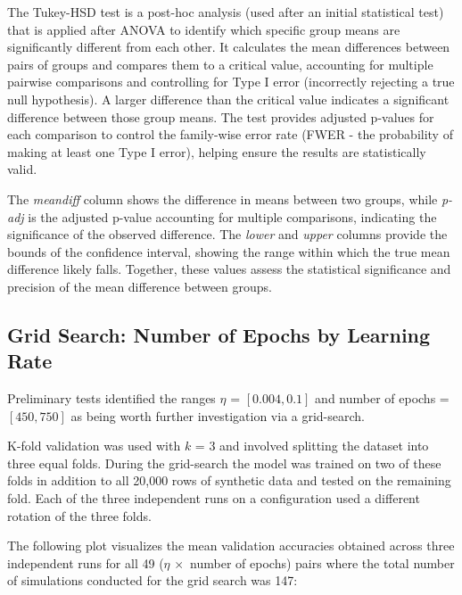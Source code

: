 The Tukey-HSD test is a post-hoc analysis (used after an initial statistical test) that is applied after ANOVA to 
identify which specific group means are significantly different from each other. It calculates the mean differences 
between pairs of groups and compares them to a critical value, accounting for multiple pairwise comparisons and 
controlling for Type I error (incorrectly rejecting a true null hypothesis). A larger difference than the critical 
value indicates a significant difference between those group means. The test provides adjusted p-values for each 
comparison to control the family-wise error rate (FWER - the probability of making at least one Type I error), 
helping ensure the results are statistically valid. 

The {\sl meandiff} column shows the difference in means 
between two groups, while {\sl p-adj} is the adjusted p-value accounting for multiple comparisons, indicating the 
significance of the observed difference. The {\sl lower} and {\sl upper} columns provide the bounds of the confidence interval, 
showing the range within which the true mean difference likely falls. Together, these values assess the statistical 
significance and precision of the mean difference between groups.

\subsection{Grid Search: Number of Epochs by Learning Rate}

Preliminary tests identified the ranges $\eta$ = $[0.004, 0.1]$ and 
number of epochs = $[450, 750]$ as being worth further investigation via a grid-search. 

K-fold validation was used with $k$ = $3$ and involved splitting the dataset into three equal folds. During the grid-search the
model was trained on two of these folds in addition to all 20,000 rows of synthetic data and tested on the remaining fold. Each 
of the three independent runs on a configuration used a different rotation of the three folds.

The following plot visualizes the mean validation accuracies obtained across three independent runs for all 
49 ($\eta \, \times$ number of epochs) pairs where the total number of simulations conducted for the grid search was 147:

